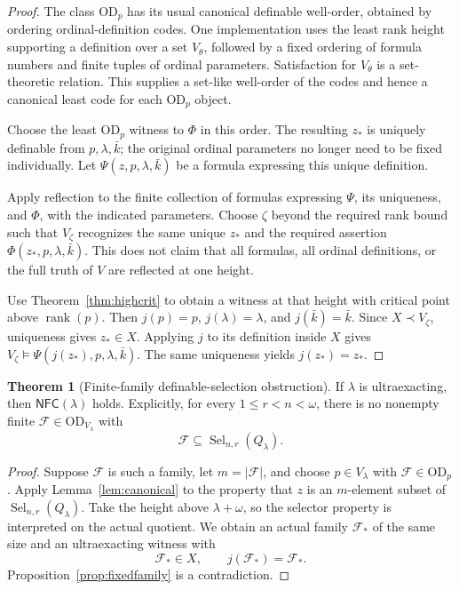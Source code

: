\documentclass[11pt,letterpaper]{article}
\theoremstyle{definition}
\newtheorem{theorem}[definition]{Theorem}
\newcommand{\OD}{\mathrm{OD}}
\newcommand{\rank}{\operatorname{rank}}
\newcommand{\Sel}{\operatorname{Sel}}
\newcommand{\FF}{\mathscr F}
\newcommand{\NFC}{\mathsf{NFC}}
\begin{document}
\begin{proof}
The class $\OD_p$ has its usual canonical definable well-order, obtained by ordering ordinal-definition codes. One implementation uses the least rank height supporting a definition over a set $V_\theta$, followed by a fixed ordering of formula numbers and finite tuples of ordinal parameters. Satisfaction for $V_\theta$ is a set-theoretic relation. This supplies a set-like well-order of the codes and hence a canonical least code for each $\OD_p$ object.

Choose the least $\OD_p$ witness to $\Phi$ in this order. The resulting $z_*$ is uniquely definable from $p,\lambda,\bar k$; the original ordinal parameters no longer need to be fixed individually. Let $\Psi(z,p,\lambda,\bar k)$ be a formula expressing this unique definition.

Apply reflection to the finite collection of formulas expressing $\Psi$, its uniqueness, and $\Phi$, with the indicated parameters. Choose $\zeta$ beyond the required rank bound such that $V_\zeta$ recognizes the same unique $z_*$ and the required assertion $\Phi(z_*,p,\lambda,\bar k)$. This does not claim that all formulas, all ordinal definitions, or the full truth of $V$ are reflected at one height.

Use Theorem~\ref{thm:highcrit} to obtain a witness at that height with critical point above $\rank(p)$. Then $j(p)=p$, $j(\lambda)=\lambda$, and $j(\bar k)=\bar k$. Since $X\prec V_\zeta$, uniqueness gives $z_*\in X$. Applying $j$ to its definition inside $X$ gives $V_\zeta\models\Psi(j(z_*),p,\lambda,\bar k)$. The same uniqueness yields $j(z_*)=z_*$.
\end{proof}

\begin{theorem}[Finite-family definable-selection obstruction]\label{thm:main}
If $\lambda$ is ultraexacting, then $\NFC(\lambda)$ holds. Explicitly, for every $1\leq r<n<\omega$, there is no nonempty finite $\FF\in\OD_{V_\lambda}$ with
\[
 \FF\subseteq\Sel_{n,r}(Q_\lambda).
\]
\end{theorem}

\begin{proof}
Suppose $\FF$ is such a family, let $m=|\FF|$, and choose $p\in V_\lambda$ with $\FF\in\OD_p$. Apply Lemma~\ref{lem:canonical} to the property that $z$ is an $m$-element subset of $\Sel_{n,r}(Q_\lambda)$. Take the height above $\lambda+\omega$, so the selector property is interpreted on the actual quotient. We obtain an actual family $\FF_*$ of the same size and an ultraexacting witness with
\[
 \FF_*\in X,\qquad j(\FF_*)=\FF_*.
\]
Proposition~\ref{prop:fixedfamily} is a contradiction.
\end{proof}
\end{document}
